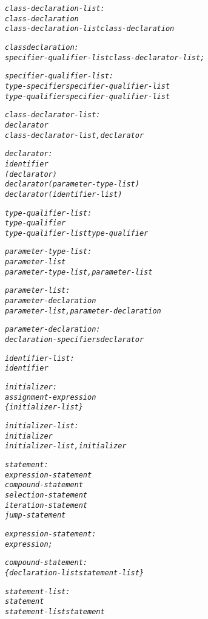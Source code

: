 \documentclass[12pt]{report}
\begin{document}
\begin{alltt}
     \textit{class-declaration-list:}
          \textit{class-declaration}
          \textit{class-declaration-list class-declaration}
          
     \textit{class declaration:}
          \textit{specifier-qualifier-list class-declarator-list;}
          
     \textit{specifier-qualifier-list:}
          \textit{type-specifier specifier-qualifier-list}
          \textit{type-qualifier specifier-qualifier-list}
          
     \textit{class-declarator-list:}
          \textit{declarator}
          \textit{class-declarator-list, declarator}
          
     \textit{declarator:}
          \textit{identifier}
          \textit{( declarator )}
          \textit{declarator ( parameter-type-list )}
          \textit{declarator ( identifier-list )}
          
     \textit{type-qualifier-list:}
          \textit{type-qualifier}
          \textit{type-qualifier-list type-qualifier}
          
     \textit{parameter-type-list:}
          \textit{parameter-list}
          \textit{parameter-type-list , parameter-list}
          
     \textit{parameter-list:}
          \textit{parameter-declaration}
          \textit{parameter-list , parameter-declaration}
          
     \textit{parameter-declaration:}
          \textit{declaration-specifiers declarator}
          
     \textit{identifier-list:}
          \textit{identifier}
          
     \textit{initializer:}
          \textit{assignment-expression}
          \textit{\{ initializer-list \}}
          
     \textit{initializer-list:}
          \textit{initializer}
          \textit{initializer-list , initializer}
          
     \textit{statement:}
          \textit{expression-statement}
          \textit{compound-statement}
          \textit{selection-statement}
          \textit{iteration-statement}
          \textit{jump-statement}
          
     \textit{expression-statement:}
          \textit{expression;}
          
     \textit{compound-statement:}
          \textit{\{ declaration-list statement-list \}}
          
     \textit{statement-list:}
          \textit{statement}
          \textit{statement-list statement}
          

\end{alltt}
\end{document}
